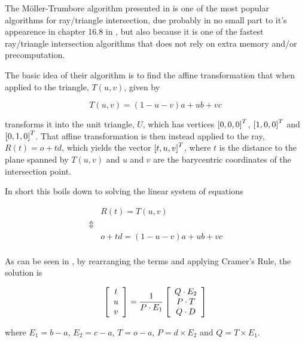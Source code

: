 
The Möller-Trumbore algorithm presented in 
is one of the most popular algorithms for ray/triangle intersection,
due probably in no small part to it's appearence in chapter 16.8 in
, but also because it is one of the fastest
ray/triangle intersection algorithms that does not rely on extra
memory and/or precomputation.



The basic idea of their algorithm is to find the affine transformation
that when applied to the triangle, $T(u,v)$, given by

\begin{displaymath}
  T(u,v) = (1-u-v)a + ub + vc
\end{displaymath}

transforms it into the unit triangle, $U$, which has vertices
$\left[0, 0, 0 \right]^T$, $\left[1, 0, 0 \right]^T$ and
$\left[0, 1, 0 \right]^T$. That affine transformation is then instead
applied to the ray, $R(t) = o + td$, which yields the vector
$\left[t, u, v \right]^T$, where $t$ is the distance to the plane spanned
by $T(u,v)$ and $u$ and $v$ are the barycentric coordinates of the
intersection point.

In short this boils down to solving the linear system of equations

\begin{displaymath}
  \begin{array}{rl}
    & R(t) = T(u,v) \\
    \Updownarrow \\
    & o + td = (1-u-v)a + ub + vc \\
  \end{array}
\end{displaymath}

As can be seen in , by rearranging the
terms and applying Cramer's Rule, the solution is

\begin{displaymath}
  \left[\begin{array}{c} t \\ u \\ v \end{array}\right] = \frac{1}{P \cdot E_1} 
  \left[\begin{array}{c} Q \cdot E_2 \\ P \cdot T \\ Q \cdot D \end{array}\right]
\end{displaymath}

where $E_1 = b - a$, $E_2 = c - a$, $T = o - a$, $P = d \times  E_2$
and $Q = T \times  E_1$.

